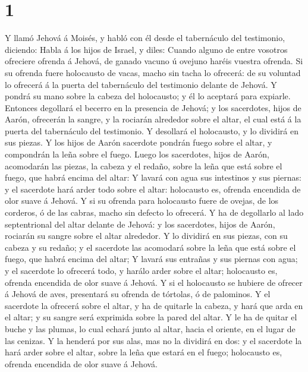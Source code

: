 \hypertarget{section}{%
\section{1}\label{section}}

 Y llamó Jehová á Moisés, y habló con él desde el
tabernáculo del testimonio, diciendo:  Habla á los hijos de
Israel, y diles: Cuando alguno de entre vosotros ofreciere ofrenda á
Jehová, de ganado vacuno ú ovejuno haréis vuestra ofrenda. 
Si su ofrenda fuere holocausto de vacas, macho sin tacha lo ofrecerá: de
su voluntad lo ofrecerá á la puerta del tabernáculo del testimonio
delante de Jehová.  Y pondrá su mano sobre la cabeza del
holocausto; y él lo aceptará para expiarle.  Entonces
degollará el becerro en la presencia de Jehová; y los sacerdotes, hijos
de Aarón, ofrecerán la sangre, y la rociarán alrededor sobre el altar,
el cual está á la puerta del tabernáculo del testimonio.  Y
desollará el holocausto, y lo dividirá en sus piezas.  Y los
hijos de Aarón sacerdote pondrán fuego sobre el altar, y compondrán la
leña sobre el fuego.  Luego los sacerdotes, hijos de Aarón,
acomodarán las piezas, la cabeza y el redaño, sobre la leña que está
sobre el fuego, que habrá encima del altar:  Y lavará con
agua sus intestinos y sus piernas: y el sacerdote hará arder todo sobre
el altar: holocausto es, ofrenda encendida de olor suave á Jehová.
 Y si su ofrenda para holocausto fuere de ovejas, de los
corderos, ó de las cabras, macho sin defecto lo ofrecerá. 
Y ha de degollarlo al lado septentrional del altar delante de Jehová: y
los sacerdotes, hijos de Aarón, rociarán su sangre sobre el altar
alrededor.  Y lo dividirá en sus piezas, con su cabeza y su
redaño; y el sacerdote las acomodará sobre la leña que está sobre el
fuego, que habrá encima del altar;  Y lavará sus entrañas y
sus piernas con agua; y el sacerdote lo ofrecerá todo, y harálo arder
sobre el altar; holocausto es, ofrenda encendida de olor suave á Jehová.
 Y si el holocausto se hubiere de ofrecer á Jehová de aves,
presentará su ofrenda de tórtolas, ó de palominos.  Y el
sacerdote la ofrecerá sobre el altar, y ha de quitarle la cabeza, y hará
que arda en el altar; y su sangre será exprimida sobre la pared del
altar.  Y le ha de quitar el buche y las plumas, lo cual
echará junto al altar, hacia el oriente, en el lugar de las cenizas.
 Y la henderá por sus alas, mas no la dividirá en dos: y el
sacerdote la hará arder sobre el altar, sobre la leña que estará en el
fuego; holocausto es, ofrenda encendida de olor suave á Jehová.

